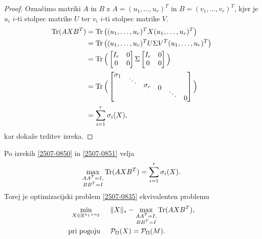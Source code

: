 \begin{proof}
    Označimo matriki $A$ in $B$ z
    $A = (u_1, \hdots , u_r)^T$ in $B = (v_1, \hdots , v_r)^T$,
    kjer je $u_i$ $i$-ti stolpec matrike $U$ ter $v_i$ $i$-ti stolpec
    matrike $V$.
    \begin{align*}
        \operatorname{Tr}(AXB^T) & = \operatorname{Tr}\big((u_1, \hdots , u_r)^T X (u_1, \hdots , u_r)^T\big)                                                                                                      \\
                   & = \operatorname{Tr}\big((u_1, \hdots , u_r)^T U \Sigma V^T (u_1, \hdots , u_r)^T\big)                                                                                           \\
                   & =\operatorname{Tr}\Big( \begin{bmatrix} I_r & 0 \\ 0 & 0 \end{bmatrix} \Sigma \begin{bmatrix} I_r & 0 \\ 0 & 0 \end{bmatrix}\Big)                                               \\
                   & = \operatorname{Tr}\Big(\begin{bmatrix} \sigma_1 \\[-8pt] & \ddots & & \\[-8pt] & & \sigma_r \\[-8pt] & &  & 0 \\[-8pt]  & & & & \ddots \\[-8pt] & & & & & 0 \end{bmatrix}\Big) \\
                   & = \sum_{i = 1}^{r} \sigma_i(X),
    \end{align*}
    kar dokaže trditev izreka.
\end{proof}
Po izrekih \ref{2507-0850} in \ref{2507-0851}
velja
\[
    \max_{
        \substack{AA^T = I,\\ BB^T = I}} \operatorname{Tr}(AXB^T) = \sum^{r}_{i = 1} \sigma_i(X).
\]
Torej je optimizacijski problem
\eqref{2507-0835} ekvivalenten
problemu
\begin{align*}
    \min_{X\in  \mathbb{R}^{n_1 \times n_2}}\hspace{0.5cm} & \lVert X\rVert_* - \max_{\substack{AA^T = I, \\ BB^T = I}} \operatorname{Tr}(AXB^T), \\
    \text{pri pogoju} \hspace{0.5cm}                       & \mathcal{P}_\Omega(X) = \mathcal{P}_\Omega(M).
\end{align*}

